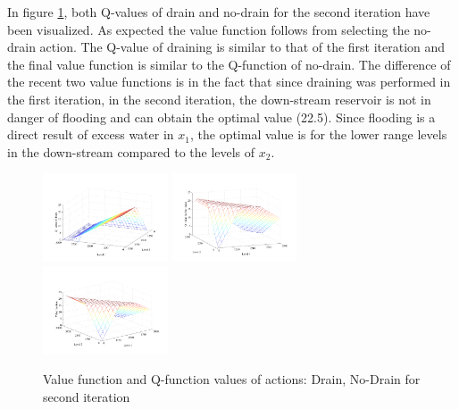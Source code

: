 \documentclass[letterpaper]{article}
\begin{document}
In figure \ref{fig:v2plots}, both Q-values of drain and no-drain for the second iteration have been visualized. As expected the value function follows from selecting the no-drain action. The Q-value of draining is similar to that of the first iteration and the final value function is similar to the Q-function of no-drain. The difference of the recent two value functions is in the fact that since draining was performed in the first iteration, in the second iteration, the down-stream reservoir is not in danger of flooding and can obtain the optimal value (22.5). Since flooding is a direct result of excess water in $x_1$, the optimal value is for the lower range levels in the down-stream compared to the levels of $x_2$. 
\begin{figure}[t]
\centering
\includegraphics[width=0.33\textwidth]{Figures1/reservoir/Q2-Drain.pdf}
\includegraphics[width=0.33\textwidth]{Figures1/reservoir/Q2-noDrain.pdf}
\includegraphics[width=0.33\textwidth]{Figures1/reservoir/v2plot.pdf}
\caption{%
Value function and Q-function values of actions: Drain, No-Drain for second iteration
}
\label{fig:v2plots}
\end{figure}
\end{document}

